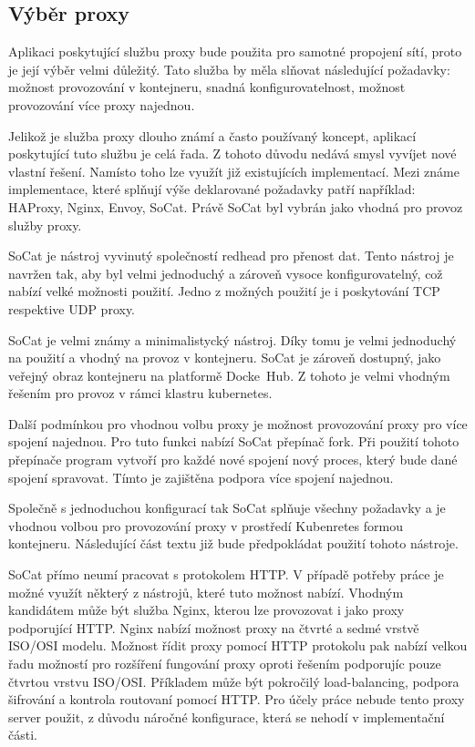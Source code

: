 \subsection{Výběr proxy}
Aplikaci poskytující službu proxy bude použita pro samotné propojení sítí, proto je její výběr velmi důležitý. Tato služba by měla slňovat následující požadavky: možnost provozování v kontejneru, snadná konfigurovatelnost, možnost provozování více proxy najednou.

Jelikož je služba proxy dlouho známí a často používaný koncept, aplikací poskytující tuto službu je celá řada. Z tohoto důvodu nedává smysl vyvíjet nové vlastní řešení. Namísto toho lze využít již existujících implementací. Mezi známe implementace, které splňují výše deklarované požadavky patří například: HAProxy, Nginx, Envoy, SoCat. Právě SoCat byl vybrán jako vhodná pro provoz služby proxy.

SoCat je nástroj vyvinutý společností redhead pro přenost dat. Tento nástroj je navržen tak, aby byl velmi jednoduchý a zároveň vysoce konfigurovatelný, což nabízí velké možnosti použití. Jedno z možných použití je i poskytování TCP respektive UDP proxy. \cite{amoany_2020_getting}

SoCat je velmi známy a minimalistycký nástroj. Díky tomu je velmi jednoduchý na použití a vhodný na provoz v kontejneru. SoCat je zároveň dostupný, jako veřejný obraz kontejneru na platformě Docke~Hub. Z tohoto je velmi vhodným řešením pro provoz v rámci klastru kubernetes.

Další podmínkou pro vhodnou volbu proxy je možnost provozování proxy pro více spojení najednou. Pro tuto funkci nabízí SoCat přepínač fork. Při použití tohoto přepínače program vytvoří pro každé nové spojení nový proces, který bude dané spojení spravovat. Tímto je zajištěna podpora více spojení najednou.

Společně s jednoduchou konfigurací tak SoCat splňuje všechny požadavky a je vhodnou volbou pro provozování proxy v prostředí Kubenretes formou kontejneru. Následující část textu již bude předpokládat použití tohoto nástroje. 

\bigskip

SoCat přímo neumí pracovat s protokolem HTTP. V případě potřeby práce je možné využít některý z nástrojů, které tuto možnost nabízí. Vhodným kandidátem může být služba Nginx, kterou lze provozovat i jako proxy podporující HTTP. Nginx nabízí možnost proxy na čtvrté a sedmé vrstvě ISO/OSI modelu. Možnost řídit proxy pomocí HTTP protokolu pak nabízí velkou řadu možností pro rozšíření fungování proxy oproti řešením podporujíc pouze čtvrtou vrstvu ISO/OSI. Příkladem může být pokročilý load-balancing, podpora šifrování a kontrola routovaní pomocí HTTP. Pro účely práce nebude tento proxy server použit, z důvodu náročné konfigurace, která se nehodí v implementační části.      

